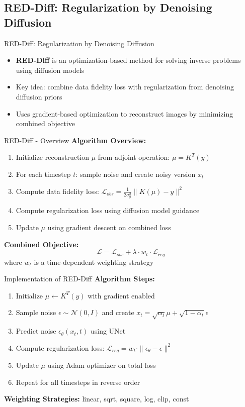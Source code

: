 \subsection{RED-Diff: Regularization by Denoising Diffusion}
\begin{frame}{RED-Diff: Regularization by Denoising Diffusion}
  \begin{itemize}
    \item \textbf{RED-Diff} is an optimization-based method for solving inverse problems using diffusion models
    \item Key idea: combine data fidelity loss with regularization from denoising diffusion priors
    \item Uses gradient-based optimization to reconstruct images by minimizing combined objective
  \end{itemize}
\end{frame}


\begin{frame}{RED-Diff - Overview}
  \textbf{Algorithm Overview:}
  \begin{enumerate}
    \item Initialize reconstruction $\mu$ from adjoint operation: $\mu = K^T(y)$
    \item For each timestep $t$: sample noise and create noisy version $x_t$
    \item Compute data fidelity loss: $\mathcal{L}_{obs} = \frac{1}{2\sigma_y^2}\|K(\mu) - y\|^2$
    \item Compute regularization loss using diffusion model guidance
    \item Update $\mu$ using gradient descent on combined loss
  \end{enumerate}

  \textbf{Combined Objective:}
  $$\mathcal{L} = \mathcal{L}_{obs} + \lambda \cdot w_t \cdot \mathcal{L}_{reg}$$
  where $w_t$ is a time-dependent weighting strategy
\end{frame}

\begin{frame}{Implementation of RED-Diff}
  \textbf{Algorithm Steps:}
  \begin{enumerate}
    \item Initialize $\mu \leftarrow K^T(y)$ with gradient enabled
    \item Sample noise $\epsilon \sim \mathcal{N}(0, I)$ and create $x_t = \sqrt{\alpha_t}\mu + \sqrt{1-\alpha_t}\epsilon$
    \item Predict noise $\epsilon_\theta(x_t, t)$ using UNet
    \item Compute regularization loss: $\mathcal{L}_{reg} = w_t \cdot \|\epsilon_\theta - \epsilon\|^2$
    \item Update $\mu$ using Adam optimizer on total loss
    \item Repeat for all timesteps in reverse order
  \end{enumerate}

  \textbf{Weighting Strategies:} linear, sqrt, square, log, clip, const
\end{frame}